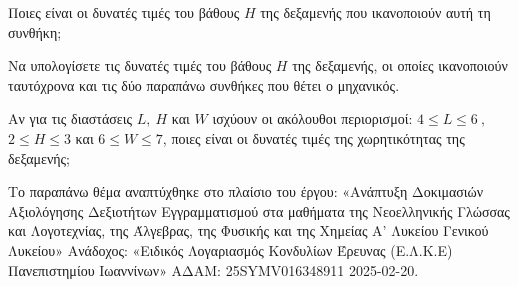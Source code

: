 \begin{alist}
\begin{center}
\end{center}
Ποιες είναι οι δυνατές τιμές του βάθους $H$ της δεξαμενής που ικανοποιούν αυτή τη συνθήκη;
\item Να υπολογίσετε τις δυνατές τιμές του βάθους $H$ της δεξαμενής, οι οποίες ικανοποιούν ταυτόχρονα και τις δύο παραπάνω συνθήκες που θέτει ο μηχανικός.
\item Αν για τις διαστάσεις $L,\ H$ και $W$ ισχύουν οι ακόλουθοι περιορισμοί: $4 \leq L \leq 6\ ,$ $2 \leq H \leq 3$ και $6 \leq W \leq 7$, ποιες είναι οι δυνατές τιμές της χωρητικότητας της δεξαμενής;

{\footnotesize Το παραπάνω θέμα αναπτύχθηκε στο πλαίσιο του έργου: «Ανάπτυξη Δοκιμασιών Αξιολόγησης Δεξιοτήτων Εγγραμματισμού στα μαθήματα της Νεοελληνικής Γλώσσας και Λογοτεχνίας, της Άλγεβρας, της Φυσικής και της Χημείας Α' Λυκείου Γενικού Λυκείου» Ανάδοχος: «Ειδικός Λογαριασμός Κονδυλίων Έρευνας (Ε.Λ.Κ.Ε) Πανεπιστημίου Ιωαννίνων» ΑΔΑΜ: 25SYMV016348911 2025-02-20.}
\end{alist}


